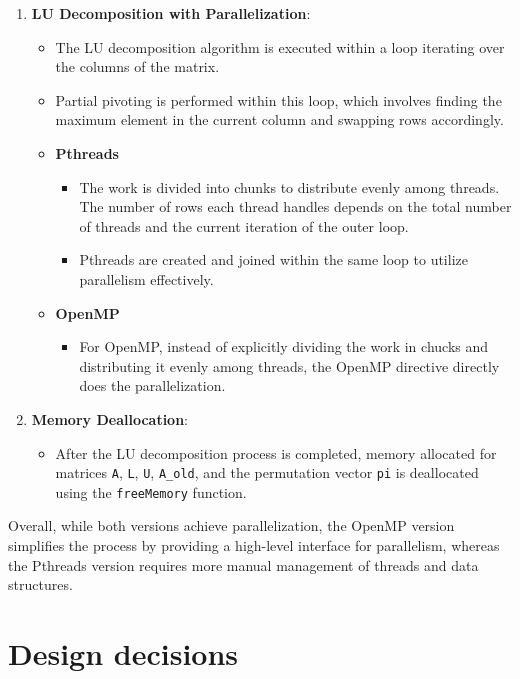\documentclass{article}
\begin{document}
\begin{enumerate}
    \item \textbf{LU Decomposition with Parallelization}:
    \begin{itemize}
        \item The LU decomposition algorithm is executed within a loop iterating over the columns of the matrix.
        \item Partial pivoting is performed within this loop, which involves finding the maximum element in the current column and swapping rows accordingly.
		\item \textbf{Pthreads}
		\begin{itemize}
			\item The work is divided into chunks to distribute evenly among threads. The number of rows each thread handles depends on the total number of threads and the current iteration of the outer loop.
			\item Pthreads are created and joined within the same loop to utilize parallelism effectively.
		\end{itemize}

		\item \textbf{OpenMP}
		\begin{itemize}
			\item For OpenMP, instead of explicitly dividing the work in chucks and distributing it evenly among threads, the OpenMP directive directly does the parallelization.
		\end{itemize}
    \end{itemize}

    \item \textbf{Memory Deallocation}:
    \begin{itemize}
        \item After the LU decomposition process is completed, memory allocated for matrices \texttt{A}, \texttt{L}, \texttt{U}, \texttt{A\_old}, and the permutation vector \texttt{pi} is deallocated using the \texttt{freeMemory} function.
    \end{itemize}

\end{enumerate}

Overall, while both versions achieve parallelization, the OpenMP version simplifies the process by providing a high-level interface for parallelism, whereas the Pthreads version requires more manual management of threads and data structures.

\clearpage

\section{Design decisions}
\end{document}
